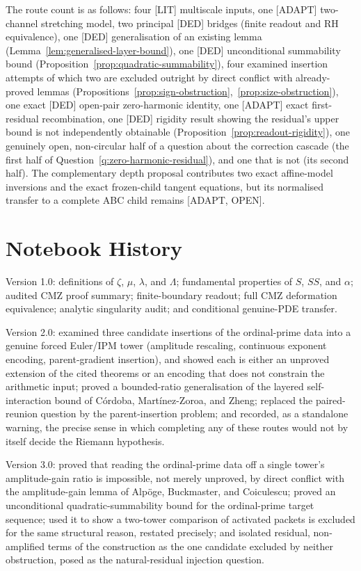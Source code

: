 \documentclass[11pt]{amsart}
\numberwithin{equation}{section}
\theoremstyle{plain}
\theoremstyle{definition}
\theoremstyle{remark}
\begin{document}
The route count is as follows: four \textup{[LIT]} multiscale inputs, one
\textup{[ADAPT]} two-channel stretching model, two principal \textup{[DED]}
bridges (finite readout and RH equivalence), one \textup{[DED]}
generalisation of an existing lemma (Lemma~\ref{lem:generalised-layer-bound}),
one \textup{[DED]} unconditional summability bound
(Proposition~\ref{prop:quadratic-summability}), four examined insertion
attempts of which two are excluded outright by direct conflict with
already-proved lemmas
(Propositions~\ref{prop:sign-obstruction},~\ref{prop:size-obstruction}), one
exact \textup{[DED]} open-pair zero-harmonic identity, one
\textup{[ADAPT]} exact first-residual recombination, one \textup{[DED]}
rigidity result showing the residual's upper bound is not independently
obtainable (Proposition~\ref{prop:readout-rigidity}), one genuinely open,
non-circular half of a question about the correction cascade (the first half
of Question~\ref{q:zero-harmonic-residual}), and one that is not (its second
half).  The complementary depth proposal contributes two exact affine-model
inversions and the exact frozen-child tangent equations, but its normalised
transfer to a complete ABC child remains \textup{[ADAPT, OPEN]}.

\section*{Notebook History}
\label{sec:notebook-history}

Version 1.0: definitions of $\zeta$, $\mu$, $\lambda$, and $\Lambda$;
fundamental properties of $S$, $SS$, and $\alpha$; audited CMZ proof summary;
finite-boundary readout; full CMZ deformation equivalence; analytic
singularity audit; and conditional genuine-PDE transfer.

Version 2.0: examined three candidate insertions of the ordinal-prime data
into a genuine forced Euler/IPM tower (amplitude rescaling, continuous
exponent encoding, parent-gradient insertion), and showed each is either an
unproved extension of the cited theorems or an encoding that does not
constrain the arithmetic input; proved a bounded-ratio generalisation of the
layered self-interaction bound of C\'ordoba, Mart\'inez-Zoroa, and Zheng;
replaced the paired-reunion question by the parent-insertion problem; and
recorded, as a standalone warning, the precise sense in which completing any
of these routes would not by itself decide the Riemann hypothesis.

Version 3.0: proved that reading the ordinal-prime data off a single
tower's amplitude-gain ratio is impossible, not merely unproved, by direct
conflict with the amplitude-gain lemma of Alp\"oge, Buckmaster, and
Coiculescu; proved an unconditional quadratic-summability bound for the
ordinal-prime target sequence; used it to show a two-tower comparison of
activated packets is excluded for the same structural reason, restated
precisely; and isolated residual, non-amplified terms of the construction
as the one candidate excluded by neither obstruction, posed as the
natural-residual injection question.
\end{document}
